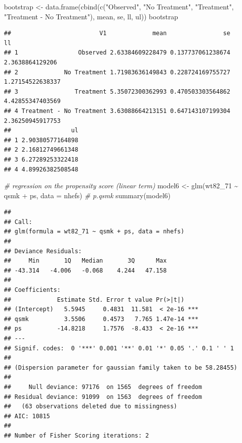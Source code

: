 \documentclass[
  10pt,
]{book}
\newenvironment{Shaded}{\begin{snugshade}}{\end{snugshade}}
\newcommand{\AttributeTok}[1]{\textcolor[rgb]{0.77,0.63,0.00}{#1}}
\newcommand{\CommentTok}[1]{\textcolor[rgb]{0.56,0.35,0.01}{\textit{#1}}}
\newcommand{\FunctionTok}[1]{\textcolor[rgb]{0.00,0.00,0.00}{#1}}
\newcommand{\NormalTok}[1]{#1}
\newcommand{\OtherTok}[1]{\textcolor[rgb]{0.56,0.35,0.01}{#1}}
\newcommand{\SpecialCharTok}[1]{\textcolor[rgb]{0.00,0.00,0.00}{#1}}
\newcommand{\StringTok}[1]{\textcolor[rgb]{0.31,0.60,0.02}{#1}}
\begin{document}
\begin{Shaded}
\begin{Highlighting}[]
\NormalTok{bootstrap }\OtherTok{\textless{}{-}} \FunctionTok{data.frame}\NormalTok{(}\FunctionTok{cbind}\NormalTok{(}\FunctionTok{c}\NormalTok{(}\StringTok{"Observed"}\NormalTok{, }\StringTok{"No Treatment"}\NormalTok{, }\StringTok{"Treatment"}\NormalTok{, }
                                \StringTok{"Treatment {-} No Treatment"}\NormalTok{), mean, se, ll, ul))}
\NormalTok{bootstrap}
\end{Highlighting}
\end{Shaded}

\begin{verbatim}
##                         V1             mean                se               ll
## 1                 Observed 2.63384609228479 0.137737061238674  2.3638864129206
## 2             No Treatment 1.71983636149843 0.228724169755727 1.27154522638337
## 3                Treatment 5.35072300362993 0.470503303564862 4.42855347403569
## 4 Treatment - No Treatment 3.63088664213151 0.647143107199304 2.36250945917753
##                 ul
## 1 2.90380577164898
## 2 2.16812749661348
## 3 6.27289253322418
## 4 4.89926382508548
\end{verbatim}

\begin{Shaded}
\begin{Highlighting}[]
\CommentTok{\# regression on the propensity score (linear term)}
\NormalTok{model6 }\OtherTok{\textless{}{-}} \FunctionTok{glm}\NormalTok{(wt82\_71 }\SpecialCharTok{\textasciitilde{}}\NormalTok{ qsmk }\SpecialCharTok{+}\NormalTok{ ps, }\AttributeTok{data =}\NormalTok{ nhefs) }\CommentTok{\# p.qsmk}
\FunctionTok{summary}\NormalTok{(model6)}
\end{Highlighting}
\end{Shaded}

\begin{verbatim}
## 
## Call:
## glm(formula = wt82_71 ~ qsmk + ps, data = nhefs)
## 
## Deviance Residuals: 
##     Min       1Q   Median       3Q      Max  
## -43.314   -4.006   -0.068    4.244   47.158  
## 
## Coefficients:
##             Estimate Std. Error t value Pr(>|t|)    
## (Intercept)   5.5945     0.4831  11.581  < 2e-16 ***
## qsmk          3.5506     0.4573   7.765 1.47e-14 ***
## ps          -14.8218     1.7576  -8.433  < 2e-16 ***
## ---
## Signif. codes:  0 '***' 0.001 '**' 0.01 '*' 0.05 '.' 0.1 ' ' 1
## 
## (Dispersion parameter for gaussian family taken to be 58.28455)
## 
##     Null deviance: 97176  on 1565  degrees of freedom
## Residual deviance: 91099  on 1563  degrees of freedom
##   (63 observations deleted due to missingness)
## AIC: 10815
## 
## Number of Fisher Scoring iterations: 2
\end{verbatim}
\end{document}
